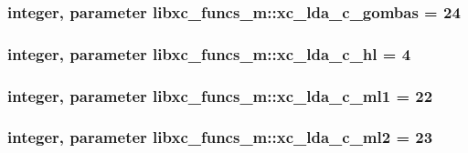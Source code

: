 \hypertarget{classlibxc__funcs__m_aae93d5c5fa3963275e8912db98db1c8b}{
\subsubsection[{xc\-\_\-lda\-\_\-c\-\_\-gombas}]{\setlength{\rightskip}{0pt plus 5cm}integer, parameter libxc\-\_\-funcs\-\_\-m\-::xc\-\_\-lda\-\_\-c\-\_\-gombas = 24}}\label{classlibxc__funcs__m_aae93d5c5fa3963275e8912db98db1c8b}
\hypertarget{classlibxc__funcs__m_a08c9e3f83851d8e0e25ef7ee758aa853}{
\subsubsection[{xc\-\_\-lda\-\_\-c\-\_\-hl}]{\setlength{\rightskip}{0pt plus 5cm}integer, parameter libxc\-\_\-funcs\-\_\-m\-::xc\-\_\-lda\-\_\-c\-\_\-hl = 4}}\label{classlibxc__funcs__m_a08c9e3f83851d8e0e25ef7ee758aa853}
\hypertarget{classlibxc__funcs__m_aec5aadeaa25b1c1f4720b3e79168247b}{
\subsubsection[{xc\-\_\-lda\-\_\-c\-\_\-ml1}]{\setlength{\rightskip}{0pt plus 5cm}integer, parameter libxc\-\_\-funcs\-\_\-m\-::xc\-\_\-lda\-\_\-c\-\_\-ml1 = 22}}\label{classlibxc__funcs__m_aec5aadeaa25b1c1f4720b3e79168247b}
\hypertarget{classlibxc__funcs__m_ab73ae35d5e783e3747a1ec8777ca472d}{
\subsubsection[{xc\-\_\-lda\-\_\-c\-\_\-ml2}]{\setlength{\rightskip}{0pt plus 5cm}integer, parameter libxc\-\_\-funcs\-\_\-m\-::xc\-\_\-lda\-\_\-c\-\_\-ml2 = 23}}\label{classlibxc__funcs__m_ab73ae35d5e783e3747a1ec8777ca472d}
